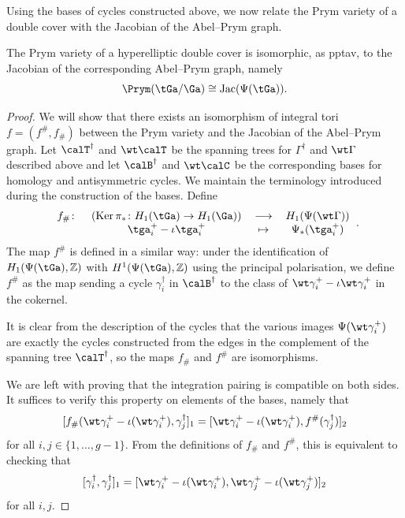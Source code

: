 Using the bases of cycles constructed above, we now relate the Prym variety of a double cover with the Jacobian of the Abel--Prym graph. 


\begin{theorem}
\label{pptavs}
    The Prym variety of a hyperelliptic double cover is isomorphic, as pptav, to the Jacobian of the corresponding Abel--Prym graph, namely
    \[
    \Prym(\tGa/\Ga)\cong \mathrm{Jac}(\Psi(\tGa)).
    \]
\end{theorem}

    \begin{proof}
        We will show that there exists an isomorphism of integral tori $f=(f^{\#},f_{\#})$ between the Prym variety and the Jacobian of the Abel--Prym graph. Let $\calT^{\dagger}$ and $\wt\calT$ be the spanning trees for $\Gamma^{\dagger}$ and $\wt\Gamma$ described above and let $\calB^{\dagger}$ and $\wt\calC$ be the corresponding bases for homology and antisymmetric cycles. 
       We  maintain the  terminology introduced during the construction of the bases. 
         Define
\[
 \begin{tabular}{cccc}
	    $f_{\#} \colon$&$(\mathrm{Ker}\,\pi_*\colon H_1(\tGa)\to H_1(\Ga))$&$\longrightarrow$&$H_1(\Psi(\wt\Gamma))$  \\
	         &$\tga_{i}^+-\iota \tga_{i}^+$&$\mapsto$&$\Psi_*(\tga_{i}^+)$
	    \end{tabular}.
\]
The map $f^\#$ is defined  in a similar way:
under the identification of $H_1(\Psi(\tGa),\mathbb Z)$  with $H^1(\Psi(\tGa),\mathbb Z)$ using the principal polarisation, we define $f^{\#}$ as the map sending a cycle $\gamma_i^{\dagger}$ in $\calB^{\dagger}$  to the class of $\wt\gamma_i^+ - \iota\wt\gamma_i^+$ in the cokernel. 

It is clear from the description of the cycles that the various images $\Psi(\wt\gamma_i^+)$ are exactly the cycles constructed from the edges in the complement of the spanning tree $\calT^{\dagger}$, so  the maps $f_{\#}$ and $f^{\#}$ are isomorphisms. 

We are left with proving that the integration pairing is compatible on both sides.
It suffices to verify this property on elements of the bases, namely that
\[
[f_{\#}(\wt\gamma_i^{+} - \iota(\wt\gamma_i^{+}), \gamma_j^{\dagger}]_1 =
[\wt\gamma_i^{+} - \iota(\wt\gamma_i^{+}), f^{\#}(\gamma_j^{\dagger})]_2 
\]
for all $i,j\in\{1,\ldots,g-1\}$. From the definitions of $f_{\#}$ and $f^{\#}$, this is equivalent to checking that
\[
[\gamma_i^{\dagger}, \gamma_j^{\dagger}]_1 =
[\wt\gamma_i^{+} - \iota(\wt\gamma_i^{+}), \wt\gamma_j^{+} - \iota(\wt\gamma_j^{+})]_2
\]
for all $i,j$.


\end{proof}
